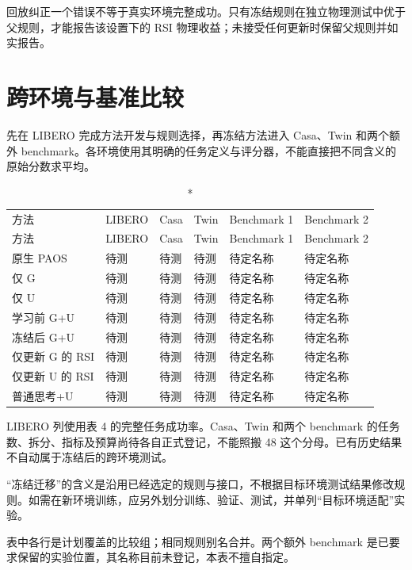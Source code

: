 \documentclass[UTF8,10pt,a4paper]{ctexart}
\begin{document}
回放纠正一个错误不等于真实环境完整成功。只有冻结规则在独立物理测试中优于父规则，才能报告该设置下的 RSI 物理收益；未接受任何更新时保留父规则并如实报告。

\clearpage
\section*{跨环境与基准比较}
先在 LIBERO 完成方法开发与规则选择，再冻结方法进入 Casa、Twin 和两个额外 benchmark。各环境使用其明确的任务定义与评分器，不能直接把不同含义的原始分数求平均。
\begin{small}
\begin{longtable}{>{\raggedright\arraybackslash}p{3.62cm}>{\raggedright\arraybackslash}p{2.13cm}>{\raggedright\arraybackslash}p{2.13cm}>{\raggedright\arraybackslash}p{2.13cm}>{\raggedright\arraybackslash}p{2.34cm}>{\raggedright\arraybackslash}p{2.34cm}}
\caption*{表 7 跨环境主结果预留表}\\
\toprule
方法 & LIBERO & Casa & Twin & Benchmark 1 & Benchmark 2\\\midrule
\endfirsthead
\toprule
方法 & LIBERO & Casa & Twin & Benchmark 1 & Benchmark 2\\\midrule
\endhead
原生 PAOS & 待测 & 待测 & 待测 & 待定名称 & 待定名称\\
仅 G & 待测 & 待测 & 待测 & 待定名称 & 待定名称\\
仅 U & 待测 & 待测 & 待测 & 待定名称 & 待定名称\\
学习前 G+U & 待测 & 待测 & 待测 & 待定名称 & 待定名称\\
冻结后 G+U & 待测 & 待测 & 待测 & 待定名称 & 待定名称\\
仅更新 G 的 RSI & 待测 & 待测 & 待测 & 待定名称 & 待定名称\\
仅更新 U 的 RSI & 待测 & 待测 & 待测 & 待定名称 & 待定名称\\
普通思考+U & 待测 & 待测 & 待测 & 待定名称 & 待定名称\\
\bottomrule
\end{longtable}
\end{small}
LIBERO 列使用表 4 的完整任务成功率。Casa、Twin 和两个 benchmark 的任务数、拆分、指标及预算尚待各自正式登记，不能照搬 48 这个分母。已有历史结果不自动属于冻结后的跨环境测试。

“冻结迁移”的含义是沿用已经选定的规则与接口，不根据目标环境测试结果修改规则。如需在新环境训练，应另外划分训练、验证、测试，并单列“目标环境适配”实验。

表中各行是计划覆盖的比较组；相同规则别名合并。两个额外 benchmark 是已要求保留的实验位置，其名称目前未登记，本表不擅自指定。
\end{document}
